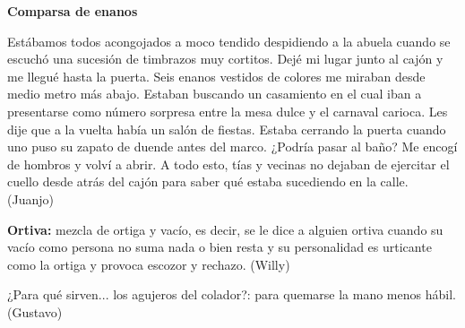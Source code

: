 \documentclass[11pt,twoside,openright,a5paper]{book}
\begin{document}
\textbf{Comparsa de enanos}

Estábamos todos acongojados a moco tendido despidiendo a la abuela cuando se escuchó una sucesión de timbrazos muy cortitos. Dejé mi lugar junto al cajón y me llegué hasta la puerta. Seis enanos vestidos de colores me miraban desde medio metro más abajo. Estaban buscando un casamiento en el cual iban a presentarse como número sorpresa entre la mesa dulce y el carnaval carioca. Les dije que a la vuelta había un salón de fiestas. Estaba cerrando la puerta cuando uno puso su zapato de duende antes del marco. ¿Podría pasar al baño? Me encogí de hombros y volví a abrir. A todo esto, tías y vecinas no dejaban de ejercitar el cuello desde atrás del cajón para saber qué estaba sucediendo en la calle. (Juanjo)

\vspace{0.5cm}

\textbf{Ortiva:} mezcla de ortiga y vacío, es decir, se le dice a alguien ortiva cuando su vacío como persona no suma nada o bien resta y su personalidad es urticante como la ortiga y provoca escozor y rechazo. (Willy)

\vspace{0.5cm}

¿Para qué sirven... los agujeros del colador?: para quemarse la mano menos hábil. (Gustavo)
\end{document}
